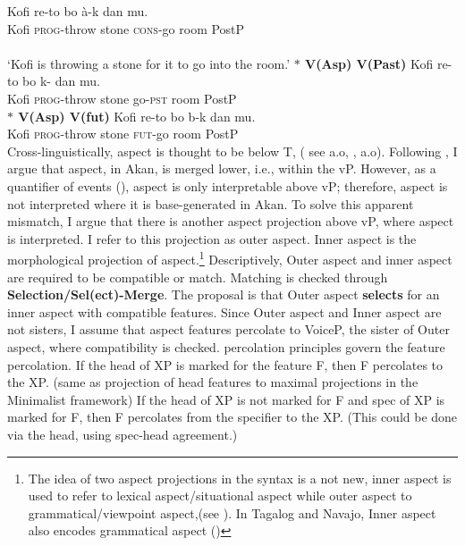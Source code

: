 \documentclass[output=paper,
modfonts
]{langscibook}
\begin{document}
\ea\label{ex041} 
\gll Kofi re-to bo \`a-k dan mu.\\
	Kofi \textsc{prog}-throw stone \textsc{cons}-go room PostP\\
	 \\
\glt `Kofi is throwing a stone for it to go into the room.'
\z 
\ex\label{ex051}
\textbf{$\ast$ \phantom {} {} {}  V(Asp)\phantom {} {} {}   V(Past)} 
     \ea\label{ex7} 
\gll * Kofi re-to bo k- dan mu.\\
	{} Kofi \textsc{prog}-throw  stone  go-\textsc{pst} room PostP\\
\z 
\ex\label{ex061}
\textbf{$\ast$ \phantom {} {} {}  V(Asp)\phantom {} {} {}   V(fut)} 
     \ea\label{ex1} 
\gll * Kofi re-to bo  b-k dan mu.\\
	{} Kofi \textsc{prog}-throw stone  \textsc{fut}-go room PostP\\

\z 
\z \z Cross-linguistically, aspect is thought to be below T, ( see \citet{Rizzi2004} \citet{Rizzi2013Notes} a.o, \citet{Cinque2002, Cinque2006}, \citet{RizziCinque2016} \citet{CinqueRizzi2010} a.o). Following \citet{Kandybowicz2010, Kandybowicz2015}, I argue that aspect, in Akan, is merged lower, i.e., within the vP.  However, as a quantifier of events (\citet{Hacquard2006}), aspect is only interpretable above vP; therefore, aspect is not interpreted where it is base-generated in Akan. To solve this apparent mismatch, I argue that there is another aspect projection above vP, where aspect is interpreted. I refer to this projection as outer aspect. Inner aspect is the morphological projection of aspect.\footnote{The idea of two aspect projections in the syntax is a not new, inner aspect is used to refer to lexical aspect/situational aspect while outer aspect to grammatical/viewpoint aspect,(see \citealt{Travis2010, Travis1991, Smith1991, MacDonald2006}). In Tagalog and Navajo, Inner aspect also encodes grammatical aspect (\citet{Travis2010})} Descriptively, Outer aspect and inner aspect are required to be compatible or match. Matching is checked through \textbf{Selection/Sel(ect)-Merge}. The proposal is that Outer aspect \textbf{selects} for an inner aspect with compatible features. Since Outer aspect and Inner aspect are not sisters, 
I assume that aspect features percolate to VoiceP, the sister of Outer aspect, where compatibility is checked.  percolation principles govern the feature percolation. \nocite{Webelhuth1992}
\ea \label{ex16}
\ea If the head of XP is marked for the feature F, then F percolates to the XP. (same as projection of head features to maximal projections in the Minimalist framework)
\ex If the head of XP is not marked for F and spec of XP is marked for F, then F percolates from the specifier to the XP. (This could be done via the head, using spec-head agreement.)
\end{document}
